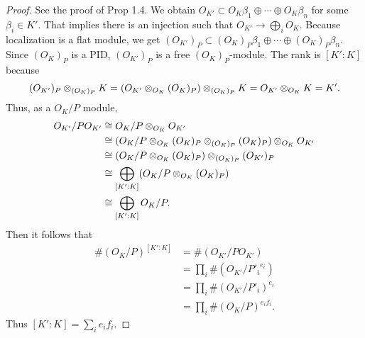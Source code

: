 \begin{proof}
See the proof of Prop 1.4. We obtain $O_{K'} \subset O_K \beta_1 \oplus \cdots \oplus  O_K \beta_n$ for some $\beta_i  \in K'$. That implies there is an injection such that $O_{K'} \to \bigoplus_i O_K$. Because localization is a flat module, we get $(O_{K'})_P \subset (O_K )_P \beta_1 \oplus \cdots \oplus  (O_K )_P \beta_n$. Since $(O_K)_P$ is a PID, $(O_{K'})_P$ is a free $(O_K)_P$-module.
The rank is $[K':K]$ because
\[
(O_{K'})_P \otimes_{(O_K)_P} K = (O_{K'} \otimes_{O_K} (O_K)_P ) \otimes_{(O_K)_P}  K = O_{K'} \otimes_{O_K} K = K'.
\]
Thus, as a $O_K /  P$ module,
\begin{align*}
O_{K'} / P O_{K'} &\cong O_K/P \otimes_{O_K} O_{K'} \\
&\cong  (O_K/P \otimes_{O_K} (O_K)_P \otimes_{(O_K)_P}  (O_K)_P ) \otimes_{O_K}  O_{K'}  \\
&\cong (O_K/P \otimes_{O_K} (O_K)_P) \otimes_{(O_K)_P} ( O_{K'})_P \\
&\cong \bigoplus_{[K':K]}  (O_K/P \otimes_{O_K} (O_K)_P) \\
&\cong \bigoplus_{[K':K]}  O_K /P .
\end{align*}
Then it follows that
\begin{align*}
  \#(O_K / P)^{[K':K]} &= \# (O_{K'} / P O_{K'} ) \\
  &= \prod_i \#(O_{K'} / {P'_i}^{e_i} ) \\
  &=  \prod_i \#(O_{K'} / P'_i )^{e_i} \\
  &=  \prod_i \#(O_{K} / P)^{e_{i} f_{i} }.
\end{align*}
Thus $[K':K] = \sum_i e_{i} f_{i}$.
\end{proof}

\begin{comment}
\bfsubsection{Lemma 1.16}
\barquo{
Thus
\begin{align*}
  \dim_{O_K/P} O_{K'}/PO_{K'} &=   \dim_{O_K/P} (O_{K'})_P / P(O_{K'})_P \\
  &=  \dim_{O_K/P} ((O_{K})_P / P(O_{K})_P) \ts_{(O_K)_P} (O_{K'})_P
\end{align*}
}
\begin{proof}
  We set $A = O_K, A'=O_{K'}$. Then we get
  \begin{align*}
    A'/PA' &\cong A' \ts_A A/P \\
    &\cong A' \ts_A \Frac A/P \\
    &\cong A' \ts_A \Coker (PA_P \to A_P) \\
    &\cong \Coker (A' \ts_A PA_P \to A' \ts_A A_P) \\
    &\cong (A')_P / P(A')_P \\
    (A')_P / P(A')_P  &\cong A' \ts_A \Coker (PA_P \to A_P) \\
    &\cong A' \ts_A A_P / PA_P \\
    &\cong (A' \ts_A  A_P) \ts_{A_P} A_P / PA_P \\
    &\cong (A')_P \ts_{A_P} A_P / PA_P.
  \end{align*}
\end{proof}
\end{comment}

